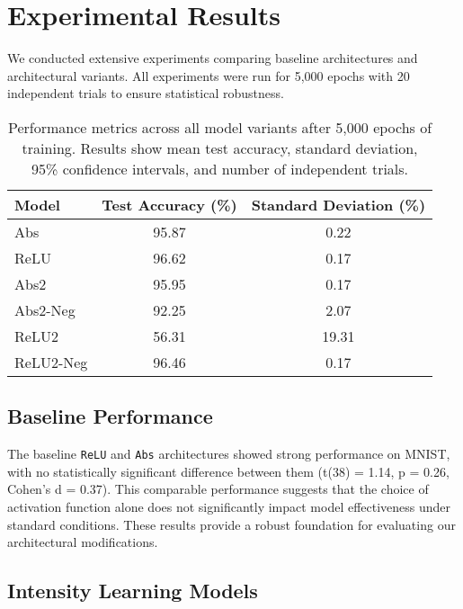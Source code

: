 \section{Experimental Results}
\label{sec:results}

We conducted extensive experiments comparing baseline architectures and architectural variants. All experiments were run for 5,000 epochs with 20 independent trials to ensure statistical robustness.

\begin{table}[H]
    \centering
    \begin{tabular}{lcc}
        \toprule
        \textbf{Model} & \textbf{Test Accuracy (\%)} & \textbf{Standard Deviation (\%)}\\
        \midrule
        Abs & 95.87 & 0.22 \\
        ReLU & 96.62 & 0.17 \\
        \midrule
        Abs2 & 95.95 & 0.17 \\
        Abs2-Neg & 92.25 & 2.07 \\
        ReLU2 & 56.31 & 19.31 \\
        ReLU2-Neg & 96.46 & 0.17 \\
        \bottomrule
    \end{tabular}
    \caption{Performance metrics across all model variants after 5,000 epochs of training. Results show mean test accuracy, standard deviation, 95\% confidence intervals, and number of independent trials.}
    \label{tab:model_performance}
\end{table}

\subsection{Baseline Performance}
The baseline \texttt{ReLU} and \texttt{Abs} architectures showed strong performance on MNIST, with no statistically significant difference between them (t(38) = 1.14, p = 0.26, Cohen's d = 0.37). This comparable performance suggests that the choice of activation function alone does not significantly impact model effectiveness under standard conditions. These results provide a robust foundation for evaluating our architectural modifications.

\subsection{Intensity Learning Models}

